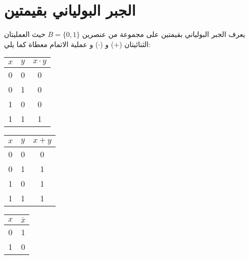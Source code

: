 \section{الجبر البولياني بقيمتين}
يعرف الجبر البولياني بقيمتين على مجموعة من عنصرين $B = \{0, 1\}$ حيث العمليتان الثنائيتان (+) و ($\cdot$) و عملية الاتمام معطاة كما يلي:
\begin{english}
	\begin{table}[H]
		\centering
		\begin{minipage}{0.3\textwidth}
			\centering
			\begin{tabular}{|c|c|c|}
				\hline
				$x$ & $y$ & $x\cdot y$ \\
				\hline
				0 & 0 & 0 \\
				0 & 1 & 0 \\
				1 & 0 & 0 \\
				1 & 1 & 1 \\
				\hline
			\end{tabular}
		\end{minipage}
		\begin{minipage}{0.3\textwidth}
			\centering
				\begin{tabular}{|c|c|c|}
				\hline
				$x$ & $y$ & $x + y$ \\
				\hline
				0 & 0 & 0 \\
				0 & 1 & 1 \\
				1 & 0 & 1 \\
				1 & 1 & 1 \\
				\hline
			\end{tabular}
		\end{minipage}
		\begin{minipage}{0.3\textwidth}
			\centering
			\begin{tabular}{|c|c|}
				\hline
				$x$ & $\bar{x}$\\
				\hline
				0 & 1\\
				1 & 0\\
				\hline
			\end{tabular}
		\end{minipage}
	\end{table}
\end{english}

